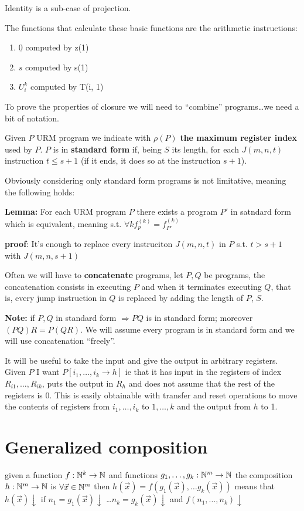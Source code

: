 Identity is a sub-case of projection.

The functions that calculate these basic functions are the arithmetic instructions:
\begin{enumerate}
\item $\underline{0}$ computed by z(1)
\item $s$ computed by s(1)
\item $ U_i^k$ computed by T(i, 1)
\end{enumerate}

To prove the properties of closure we will need to ``combine'' programs\dots we need a bit of notation.

Given $P$ URM program we indicate with $ \rho(P) $ \textbf{the maximum register index} used by $P$. $P$ is in \textbf{standard form} if, being $S$ its length, for each $J(m,n,t)$ instruction $t\leq s+1$ (if it ends, it does so at the instruction $s+1$).

Obviously considering only standard form programs is not limitative, meaning the following holds:

\textbf{Lemma:} For each URM program $P$ there exists a program $P'$ in satndard form which is equivalent, meaning s.t. $\forall k f_p^{(k)} = f_{P'}^{(k)}$

\textbf{proof}: It's enough to replace every instruciton $J(m,n,t)$ in $P$ s.t. $t>s+1$ with $J(m,n,s+1)$

Often we will have to \textbf{concatenate} programs, let $P, Q$ be programs, the concatenation consists in executing $P$ and when it terminates executing $Q$, that is, every jump instruction in $Q$ is replaced by adding the length of $P$, $S$.

\textbf{Note:} if $P,Q$ in standard form $\Rightarrow PQ$ is in standard form; moreover $(PQ)R = P(QR)$. We will assume every program is in standard form and we will use concatenation ``freely''.

It will be useful to take the input and give the output in arbitrary registers. Given $P$ I want $ P[i_1,\dots,i_k \rightarrow h] $ ie that it has input in the registers of index $ R_{i1},\dots,R_{ik} $, puts the output in $ R_h $ and does not assume that the rest of the registers is 0. This is easily obtainable with transfer and reset operations to move the contents of registers from $ i_1,\dots,i_k $ to $ 1,\dots,k $ and the output from $h$ to 1.

\section {Generalized composition}
given a function
$ f: \mathbb{N}^k \rightarrow \mathbb{N} $ and functions
$ g_1,\dots,g_k: \mathbb{N}^m \rightarrow \mathbb{N} $
the composition $ h: \mathbb{N}^m \rightarrow \mathbb{N} $
is $ \forall \vec{x} \in \mathbb{N}^m $ then
$ h(\vec{x}) = f(g_1(\vec{x}), \dots g_k(\vec{x}))
$ means that $ h(\vec{x}) \downarrow $ if $ n_1 = g_1(\vec{x}) \downarrow $
\dots $ n_k = g_k(\vec{x}) \downarrow $ and $ f(n_1,\dots,n_k) \downarrow $

